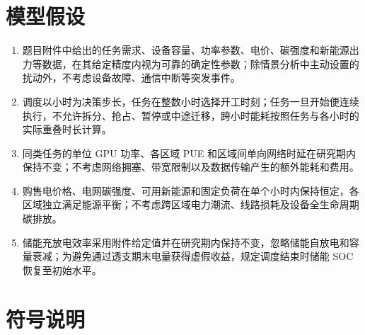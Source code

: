 \documentclass[withoutpreface,bwprint]{cumcmthesis}
\begin{document}
\section{模型假设}

\begin{enumerate}
\item 题目附件中给出的任务需求、设备容量、功率参数、电价、碳强度和新能源出力等数据，在其给定精度内视为可靠的确定性参数；除情景分析中主动设置的扰动外，不考虑设备故障、通信中断等突发事件。
\item 调度以小时为决策步长，任务在整数小时选择开工时刻；任务一旦开始便连续执行，不允许拆分、抢占、暂停或中途迁移，跨小时能耗按照任务与各小时的实际重叠时长计算。
\item 同类任务的单位 GPU 功率、各区域 PUE 和区域间单向网络时延在研究期内保持不变；不考虑网络拥塞、带宽限制以及数据传输产生的额外能耗和费用。
\item 购售电价格、电网碳强度、可用新能源和固定负荷在单个小时内保持恒定，各区域独立满足能源平衡；不考虑跨区域电力潮流、线路损耗及设备全生命周期碳排放。
\item 储能充放电效率采用附件给定值并在研究期内保持不变，忽略储能自放电和容量衰减；为避免通过透支期末电量获得虚假收益，规定调度结束时储能 SOC 恢复至初始水平。
\end{enumerate}
\section{符号说明}
\end{document}
